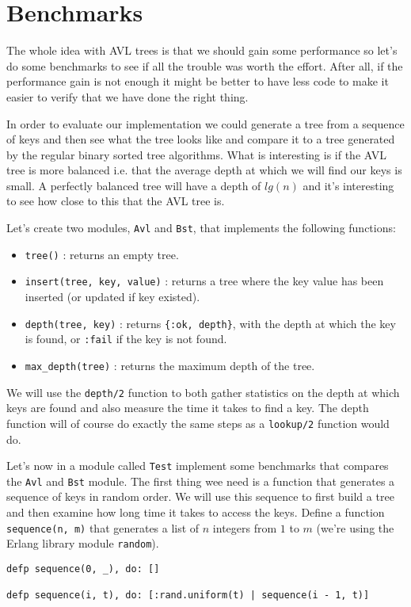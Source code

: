 \documentclass[a4paper,11pt]{article}
\begin{document}
\section{Benchmarks}

The whole idea with AVL trees is that we should gain some performance
so let's do some benchmarks to see if all the trouble was worth the
effort. After all, if the performance gain is not enough it might be
better to have less code to make it easier to verify that we have done
the right thing.

In order to evaluate our implementation we could generate a tree from
a sequence of keys and then see what the tree looks like and compare
it to a tree generated by the regular binary sorted tree
algorithms. What is interesting is if the AVL tree is more balanced
i.e. that the average depth at which we will find our keys is small. A
perfectly balanced tree will have a depth of $lg(n)$ and it's
interesting to see how close to this that the AVL tree is.

Let's create two modules, {\tt Avl} and {\tt Bst}, that implements the
following functions:

\begin{itemize}
\item {\tt tree()} : returns an empty tree.
\item {\tt insert(tree, key, value)} : returns a tree where the key value has been inserted (or updated if key existed).
\item {\tt depth(tree, key)} : returns {\tt \{:ok, depth\}}, with the depth at which the key is found, or {\tt :fail} if the key is not found.
\item {\tt max\_depth(tree)} : returns the maximum depth of the tree. 
\end{itemize}

We will use the {\tt depth/2} function to both gather statistics on the
depth at which keys are found and also measure the time it takes to
find a key. The depth function will of course do exactly the same
steps as a {\tt lookup/2} function would do.

Let's now in a module called {\tt Test} implement some benchmarks that
compares the {\tt Avl} and {\tt Bst} module. The first thing wee need
is a function that generates a sequence of keys in random order. We
will use this sequence to first build a tree and then examine how long
time it takes to access the keys. Define a function {\tt
    sequence(n, m)} that generates a list of $n$ integers from $1$ to $m$
(we're using the Erlang library module {\tt random}).

\begin{verbatim}
defp sequence(0, _), do: []

defp sequence(i, t), do: [:rand.uniform(t) | sequence(i - 1, t)]
\end{verbatim}
\end{document}
